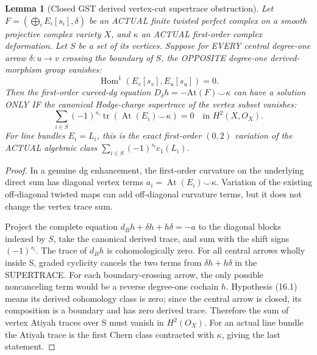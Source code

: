 \documentclass[11pt,a4paper]{article}
\newtheorem{lemma}[theorem]{Lemma}
\begin{document}
\begin{lemma}[Closed GST derived vertex-cut supertrace obstruction]
Let
\(F=(\bigoplus_i
      E_i[s_i],\delta)\)
be an ACTUAL
finite twisted
perfect complex
on a smooth
projective
complex variety
\(X\), and
\(\kappa\)
an ACTUAL
first-order
complex
deformation.
Let \(S\)
be a set of
its vertices.
Suppose for EVERY
central
degree-one
arrow \(\delta:u\to v\)
crossing the
boundary of \(S\),
the OPPOSITE
degree-one
derived-morphism
group vanishes:
\[
  \boxed{
 \operatorname{Hom}^{1}
           (E_v[s_v],E_u[s_u])=0.}
                                                               \tag{16.1}
\]
Then the
first-order
curved-dg
equation
\(
 D_\delta h
     =-\mathrm{At}(F)
                  \smile\kappa
\)
can have a
solution ONLY IF
the canonical
Hodge-charge
supertrace of
the vertex subset
vanishes:
\[
 \boxed{
 \sum_{i\in S}
   (-1)^{s_i}
      \operatorname{tr}\!
      \left(
       \operatorname{At}(E_i)
                   \smile\kappa
      \right)=0
               \quad\text{in }H^2(X,O_X).
 }                                                       \tag{16.2}
\]
For line bundles
\(E_i=L_i\),
this is the
exact first-order
\((0,2)\)
variation of
the ACTUAL
algebraic class
\(\sum_{i\in S}
        (-1)^{s_i}c_1(L_i)\).
\end{lemma}
\begin{proof}
In a genuine
dg enhancement,
the first-order
curvature on
the underlying
direct sum has
diagonal vertex
terms
\(
 a_i=\operatorname{At}(E_i)
                         \smile\kappa
\).
Variation of
the existing
off-diagonal
twisted maps
can add
off-diagonal
curvature terms,
but it does
not change the
vertex trace
sum.

Project the
complete
equation
\(
 d_Bh+\delta h+
       h\delta=-a
\)
to the diagonal
blocks indexed
by \(S\),
take the
canonical
derived trace,
and sum
with the
shift signs
\((-1)^{s_i}\).
The trace of
\(d_Bh\)
is cohomologically
zero.
For all central
arrows wholly
inside S,
graded cyclicity
cancels the
two terms
from
\(\delta h+h\delta\)
in the
SUPERTRACE.
For each
boundary-crossing
arrow, the
only possible
noncanceling
term would be
a reverse
degree-one
cochain \(h\).
Hypothesis
(16.1)
means its
derived
cohomology
class is zero;
since the
central arrow
is closed,
its composition
is a boundary
and has zero
derived trace.
Therefore the
sum of
vertex Atiyah
traces over S
must vanish
in \(H^2(O_X)\).
For an
actual line
bundle the
Atiyah trace
is the
first Chern
class contracted
with \(\kappa\),
giving the
last statement.
\end{proof}
\end{document}
